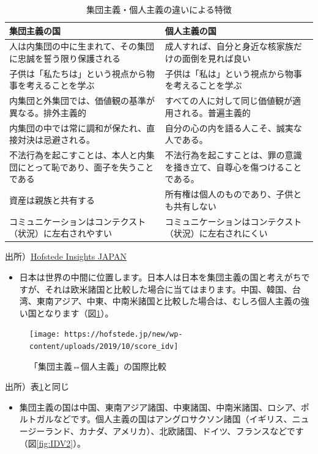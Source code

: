 \documentclass[
]{book}
\providecommand{\tightlist}{%
  \setlength{\itemsep}{0pt}\setlength{\parskip}{0pt}}
\begin{document}
\begin{table}

\caption{\label{tab:IDV0}集団主義・個人主義の違いによる特徴}
\centering
\begin{tabular}[t]{l|l}
\hline
集団主義の国 & 個人主義の国\\
\hline
人は内集団の中に生まれて、その集団に忠誠を誓う限り保護される & 成人すれば、自分と身近な核家族だけの面倒を見れば良い\\
\hline
子供は「私たちは」という視点から物事を考えることを学ぶ & 子供は「私は」という視点から物事を考えることを学ぶ\\
\hline
内集団と外集団では、価値観の基準が異なる。排外主義的 & すべての人に対して同じ価値観が適用される。普遍主義的\\
\hline
内集団の中では常に調和が保たれ、直接対決は忌避される。 & 自分の心の内を語る人こそ、誠実な人である。\\
\hline
不法行為を起こすことは、本人と内集団にとって恥であり、面子を失うことである & 不法行為を起こすことは、罪の意識を掻き立て、自尊心を傷つけることである。\\
\hline
資産は親族と共有する & 所有権は個人のものであり、子供とも共有しない\\
\hline
コミュニケーションはコンテクスト（状況）に左右されやすい & コミュニケーションはコンテクスト（状況）に左右されにくい\\
\hline
\end{tabular}
\end{table}

出所）\href{https://hofstede.jp/6dimentionsmodel_idv/}{Hofstede Insights JAPAN}

\begin{itemize}
\tightlist
\item
  日本は世界の中間に位置します。日本人は日本を集団主義の国と考えがちですが、それは欧米諸国と比較した場合に当てはまります。中国、韓国、台湾、東南アジア、中東、中南米諸国と比較した場合は、むしろ個人主義の強い国となります（図\ref{fig:IDV1}）。
\end{itemize}

\begin{figure}
\texttt{[image: https://hofstede.jp/new/wp-content/uploads/2019/10/score\_idv]} \caption{「集団主義⇔個人主義」の国際比較}\label{fig:IDV1}
\end{figure}

出所）表\ref{tab:IDV0}と同じ

\begin{itemize}
\tightlist
\item
  集団主義の国は中国、東南アジア諸国、中東諸国、中南米諸国、ロシア、ポルトガルなどです。個人主義の国はアングロサクソン諸国（イギリス、ニュージーランド、カナダ、アメリカ）、北欧諸国、ドイツ、フランスなどです（図\ref{fig:IDV2}）。
\end{itemize}
\end{document}
